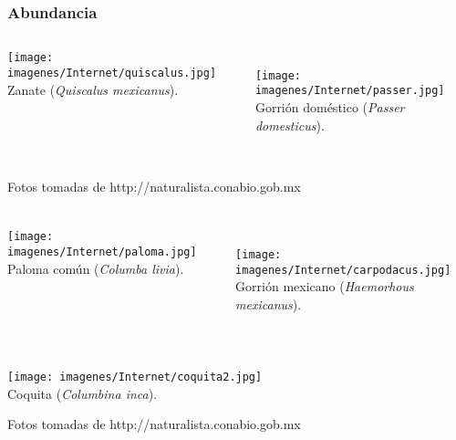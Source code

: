 \documentclass[compress]{beamer}
\begin{document}

{
\begin{frame}
\frametitle{Abundancia}
\begin{columns}[t]
\centering
\texttt{[image: imagenes/Internet/quiscalus.jpg]}\\
\caption{\normalsize{ Zanate (\textit{Quiscalus mexicanus}).}}\\
\centering
\texttt{[image: imagenes/Internet/passer.jpg]}\\
\caption{\normalsize{Gorrión doméstico (\textit{Passer domesticus}).}}
\end{columns}\\[2cm]
\tiny{Fotos tomadas de http://naturalista.conabio.gob.mx }

\end{frame}
}

{
\begin{frame}
\frametitle{}
\begin{columns}[t]
\centering
\texttt{[image: imagenes/Internet/paloma.jpg]}\\
\caption{\normalsize{ Paloma común (\textit{Columba livia}).}}\\
\centering
\texttt{[image: imagenes/Internet/carpodacus.jpg]}\\
\caption{\normalsize{ Gorrión mexicano (\textit{Haemorhous mexicanus}).}}
\end{columns}\\[-2cm]
\begin{center}
\centering
\texttt{[image: imagenes/Internet/coquita2.jpg]}\\
\caption{\normalsize{Coquita (\textit{Columbina inca}).}}
\end{center}
\tiny{Fotos tomadas de http://naturalista.conabio.gob.mx }

\end{frame}
}
\end{document}
